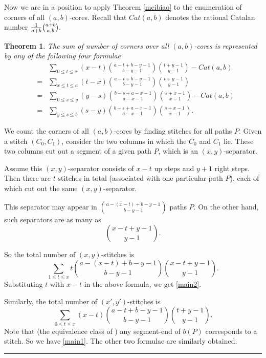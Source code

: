 \documentclass[a4paper,12pt]{article}
\def\proof{\noindent {\it{Proof.} \hskip 2pt}}
\newtheorem{thm}{Theorem}[section]
\newcommand{\qed}{{\hfill\rule{4pt}{7pt}}}
\begin{document}
Now we are in a position to apply Theorem \ref{meibiao} to the enumeration of corners of  all $(a,b)$-cores. Recall that
$Cat(a,b)$ denotes the rational Catalan number ${1\over a+b}{a+b\choose a,b}.$

\begin{thm}\label{main1}
  The sum of number of corners over all $(a,b)$-cores  is represented by any of the following four formulae
\begin{eqnarray}
 & &  \sum_{0\leq t\leq x}   (x-t) \binom{a-t+b-y-1}{b-y-1} \binom{t+y-1}{y-1} -Cat(a,b)  \label{main1} \\
 &=&  \sum_{x\leq t\leq a}   (t-x) \binom{a-t+b-y-1}{b-y-1} \binom{t+y-1}{y-1}   \label{main2p}\\
 &=&  \sum_{0\leq s\leq y}   (y-s) \binom{b-s+a-x-1}{a-x-1} \binom{s+x-1}{x-1} -Cat(a,b)   \label{main1p}\\
 &=&  \sum_{y\leq s\leq b}   (s-y) \binom{b-s+a-x-1}{a-x-1} \binom{s+x-1}{x-1}. \label{main2}
\end{eqnarray}
\end{thm}

\proof %
We count the corners of all $(a,b)$-cores by finding stitches for all paths $P$.
Given a stitch $(C_0,C_1)$, consider the two columns in which the $C_0$ and $C_1$ lie. These two columns cut out a segment of a given path $P$, which is an $(x,y)$-separator.

Assume this $(x,y)$-separator consists  of  $x-t$ up steps and $y+1$ right steps. Then there are  $t$ stitches in total (associated with one particular path $P$), each of which cut out the same $(x,y)$-separator.


This separator may appear in $\binom{a-(x-t)+b-y-1}{b-y-1}$ paths $P$.
On the other hand, such separators are as many as
$$ \binom{x-t+y-1}{y-1}. $$

So  the total number of $(x,y)$-stitches is
\begin{equation}
  \sum_{1\leq t\leq x}   t \binom{a-(x-t)+b-y-1}{b-y-1} \binom{x-t+y-1}{y-1}.
\end{equation}
Substituting $t$ with $x-t$ in the above formula, we get \eqref{main2}.


Similarly, the total number of $(x',y')$-stitches is
\begin{equation}
 \sum_{0\leq t\leq x}   (x-t) \binom{a-t+b-y-1}{b-y-1} \binom{t+y-1}{y-1} .
\end{equation}
Note that (the equivalence class of ) any segment-end of $b(P)$  corresponds to a stitch. So we have \eqref{main1}. The other two formulae are similarly obtained.
\qed
\end{document}
